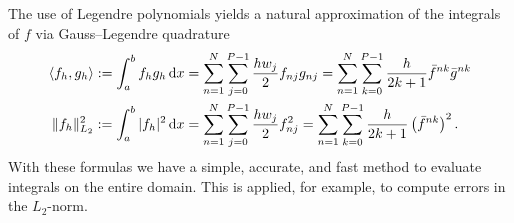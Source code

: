 The use of Legendre polynomials yields a natural approximation of the integrals of $f$
via Gauss--Legendre quadrature
\begin{subequations}
\begin{align}
    \langle f_h,g_h\rangle:=\int_a^b f_hg_h \,\mathrm{d}x &= \sum_{n=1}^N\sum_{j=0}^{P-1} \frac{hw_j}{2} f_{nj} g_{nj} 
    = \sum_{n=1}^N\sum_{k=0}^{P-1}\frac{h}{2k+1}\bar f^{nk}\bar g^{nk}  \\
    \|f_h\|^2_{L_2} := \int_a^b |f_h|^2 \,\mathrm{d}x &= \sum_{n=1}^N\sum_{j=0}^{P-1} \frac{h w_j}{2}f_{nj}^2 
    = \sum_{n=1}^N\sum_{k=0}^{P-1} \frac{h}{2k+1}\left(\bar f^{nk}\right)^2. 
    \label{eq:def_norm}
\end{align}
\label{eq:gausslegendre}
\end{subequations}
With these formulas we have a simple, accurate, and fast
method to evaluate integrals on the entire domain. This is applied, for example, to compute
errors in the $L_2$-norm.


